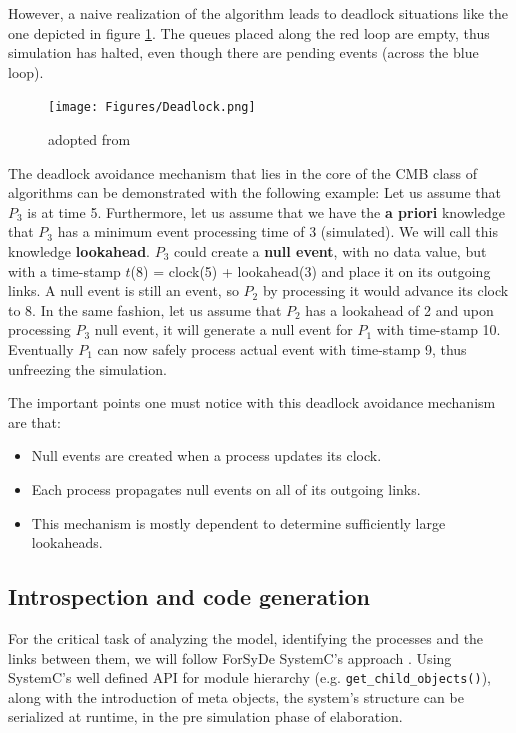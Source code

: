 \documentclass[12pt,twoside]{article}
\begin{document}
However, a naive realization of the algorithm leads to deadlock situations like the one depicted in figure \ref{fig:orgparagraph5}.
The queues placed along the red loop are empty, thus simulation has halted, even though there are pending events (across the blue loop).

\begin{figure}[htb]
\centering
\texttt{[image: Figures/Deadlock.png]}
\caption{\label{fig:orgparagraph5}
adopted from \cite{Fujimoto1999}}
\end{figure}

The deadlock avoidance mechanism that lies in the core of the CMB class of algorithms can be demonstrated with the following example:
Let us assume that \(P_3\) is at time 5.
Furthermore, let us assume that we have the \textbf{a priori} knowledge that \(P_3\) has a minimum event processing time of 3 (simulated).
We will call this knowledge \textbf{lookahead}.
\(P_3\) could create a \textbf{null event}, with no data value, but with a time-stamp \(t\)(8) = clock(5) + lookahead(3) and place it on its outgoing links.
A null event is still an event, so \(P_2\) by processing it would advance its clock to 8.
In the same fashion, let us assume that \(P_2\) has a lookahead of 2 and upon processing \(P_3\) null event, 
it will generate a null event for \(P_1\) with time-stamp 10. 
Eventually \(P_1\) can now safely process actual event with time-stamp 9, thus unfreezing the simulation.

The important points one must notice with this deadlock avoidance mechanism are that:
\begin{itemize}
\item Null events are created when a process updates its clock.
\item Each process propagates null events on all of its outgoing links.
\item This mechanism is mostly dependent to determine sufficiently large lookaheads.
\end{itemize}




\subsection{Introspection and code generation}
\label{sec:orgheadline16}
For the critical task of analyzing the model, identifying the processes and the links between them, we will follow ForSyDe SystemC's approach \cite{Hosein2012}.
Using SystemC's well defined API for module hierarchy (e.g. \texttt{get\_child\_objects()}), along with the introduction of meta objects, the system's structure can be
serialized at runtime, in the pre simulation phase of elaboration.
\end{document}
